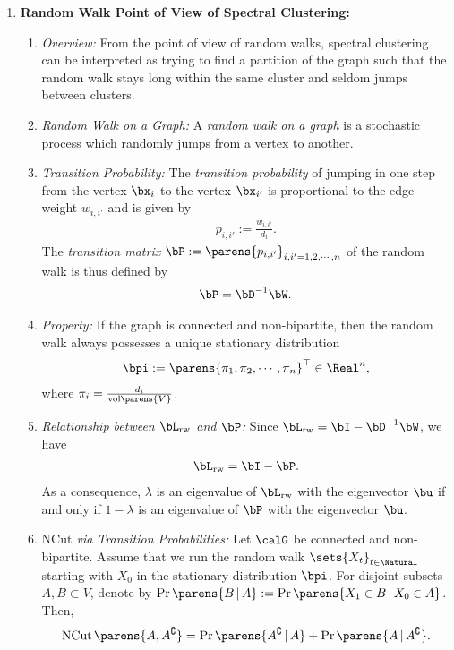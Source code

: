 \documentclass[12pt]{article}
\begin{document}
\begin{enumerate}[label=\textbf{\arabic*.}]
	\item \textbf{Random Walk Point of View of Spectral Clustering:} 
	\begin{enumerate}
		\item \textit{Overview:} From the point of view of random walks, spectral clustering can be interpreted as trying to find a partition of the graph such that the random walk stays long within the same cluster and seldom jumps between clusters. 
		
		\item \textit{Random Walk on a Graph:} A \emph{random walk on a graph} is a stochastic process which randomly jumps from a vertex to another. 
		
		\item \textit{Transition Probability:} The \emph{transition probability} of jumping in one step from the vertex $\bx_i$ to the vertex $\bx_{i'}$ is proportional to the edge weight $w_{i, i'}$ and is given by 
		\begin{align*}
			p_{i, i'} := \frac{w_{i, i'}}{d_i}. 
		\end{align*}
		The \emph{transition matrix} $\bP := \parens{p_{i, i'}}_{i, i' = 1, 2, \cdots, n}$ of the random walk is thus defined by 
		\begin{align*}
			\bP = \bD^{-1} \bW. 
		\end{align*}
		
		\item \textit{Property:} If the graph is connected and non-bipartite, then the random walk always possesses a unique stationary distribution 
		\begin{align*}
			\bpi := \parens{\pi_1, \pi_2, \cdots, \pi_n}^\top \in \Real^n, 
		\end{align*}
		where $\pi_i = \frac{d_i}{\mathrm{vol} \parens{V}}$. 
		
		\item \textit{Relationship between $\bL_{\mathrm{rw}}$ and $\bP$:} Since $\bL_{\mathrm{rw}} = \bI - \bD^{-1} \bW$, we have 
		\begin{align*}
			\bL_{\mathrm{rw}} = \bI - \bP. 
		\end{align*}
		As a consequence, $\lambda$ is an eigenvalue of $\bL_{\mathrm{rw}}$ with the eigenvector $\bu$ if and only if $1 - \lambda$ is an eigenvalue of $\bP$ with the eigenvector $\bu$. 
		
		\item \textit{$\mathrm{NCut}$ via Transition Probabilities:} Let $\calG$ be connected and non-bipartite. Assume that we run the random walk $\sets{X_t}_{t \in \Natural}$ starting with $X_0$ in the stationary distribution $\bpi$. For disjoint subsets $A, B \subset V$, denote by $\Pr \parens{B \,\vert\, A} := \Pr \parens{X_1 \in B \,\vert\, X_0 \in A}$. Then, 
		\begin{align*}
			\mathrm{NCut} \, \parens{A, A^{\complement}} = \Pr \parens{A^{\complement} \,\vert\, A} + \Pr \parens{A \,\vert\, A^{\complement}}. 
		\end{align*}
		

\end{enumerate}
\end{enumerate}
\end{document}
